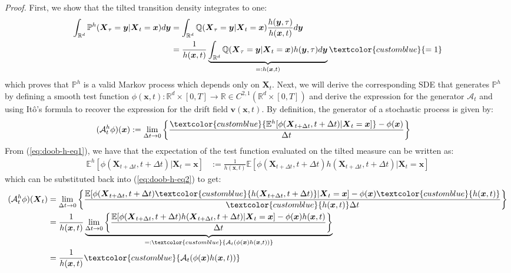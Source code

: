 \documentclass{article}
\newcommand{\bluetext}[1]{\textcolor{customblue}{#1}}
\begin{document}
\textit{Proof.} First, we show that the tilted transition density integrates to one:
\begin{align}
    \int_{\mathbb{R}^d}\mathbb{P}^h(\boldsymbol{X}_{\tau }=\boldsymbol{y}|\boldsymbol{X}_t=\boldsymbol{x})d\boldsymbol{y}&=\int_{\mathbb{R}^d}\mathbb{Q}(\boldsymbol{X}_{\tau }= \boldsymbol{y}|\boldsymbol{X}_t=\boldsymbol{x})\frac{h(\boldsymbol{y},\tau  )}{h(\boldsymbol{x},t)}d\boldsymbol{y}\nonumber\\
    &=\frac{1}{h(\boldsymbol{x},t)}\underbrace{\int_{\mathbb{R}^d}\mathbb{Q}(\boldsymbol{X}_{\tau }=\boldsymbol{y}|\boldsymbol{X}_t=\boldsymbol{x})h(\boldsymbol{y},\tau  )d\boldsymbol{y}}_{=:h(\boldsymbol{x},t)}\bluetext{=1}
\end{align}
which proves that $\mathbb{P}^h$ is a valid Markov process which depends only on $\boldsymbol{X}_t$. Next, we will derive the corresponding SDE that generates $\mathbb{P}^h$ by defining a smooth test function $\phi(\boldsymbol{x},t):\mathbb{R}^d\times [0,T]\to \mathbb{R}\in C^{2,1}(\mathbb{R}^d \times [0,T])$ and derive the expression for the generator $\mathcal{A}_t$ and using Itô's formula to recover the expression for the drift field $\boldsymbol{v}(\boldsymbol{x},t)$. By definition, the generator of a stochastic process is given by:
\begin{align}
    (\mathcal{A}^h_t\phi)(\boldsymbol{x})&:=\lim_{\Delta t \to 0}\left\{\frac{\bluetext{\mathbb{E}^h[\phi(\boldsymbol{X}_{t+\Delta t},t+\Delta t)|\boldsymbol{X}_t=\boldsymbol{x}]}-\phi(\boldsymbol{x})}{\Delta t}\right\}\label{eq:doob-h-eq2}
\end{align}
From (\ref{eq:doob-h-eq1}), we have that the expectation of the test function evaluated on the tilted measure can be written as:
\begin{align}
    \mathbb{E}^h[\phi(\boldsymbol{X}_{t+\Delta t},t+\Delta t )|\boldsymbol{X}_t=\boldsymbol{x}]&:=\frac{1}{h(\boldsymbol{x},t)}\mathbb{E}[\phi(\boldsymbol{X}_{t+\Delta t}, t+\Delta t )h(\boldsymbol{X}_{t+\Delta t}, t+\Delta t)|\boldsymbol{X}_t=\boldsymbol{x}]
\end{align}
which can be substituted back into (\ref{eq:doob-h-eq2}) to get:
\begin{align}
    (\mathcal{A}^h_t\phi)(\boldsymbol{X}_t)&=\lim_{\Delta t \to 0}\left\{\frac{{\mathbb{E}[\phi(\boldsymbol{X}_{t+\Delta t}, t+\Delta t 
    )\bluetext{h(\boldsymbol{X}_{t+\Delta t},t+\Delta t)}|\boldsymbol{X}_t=\boldsymbol{x}]}-\phi(\boldsymbol{x})\bluetext{h(\boldsymbol{x},t)}}{\bluetext{h(\boldsymbol{x},t)}\Delta t}\right\}\nonumber\\
    &=\frac{1}{h(\boldsymbol{x},t)}\underbrace{\lim_{\Delta t \to 0}\left\{\frac{{\mathbb{E}[\phi(\boldsymbol{X}_{t+\Delta t}, t+\Delta t)h(\boldsymbol{X}_{t+\Delta t},t+\Delta t)}|\boldsymbol{X}_t=\boldsymbol{x}]-\phi(\boldsymbol{x})h(\boldsymbol{x},t)}{\Delta t}\right\}}_{=:\bluetext{\mathcal{A}_t(\phi(\boldsymbol{x})h(\boldsymbol{x},t))}}\nonumber\\
    &=\frac{1}{h(\boldsymbol{x},t)}\bluetext{\mathcal{A}_t(\phi(\boldsymbol{x})h(\boldsymbol{x},t))}
\end{align}
\end{document}
